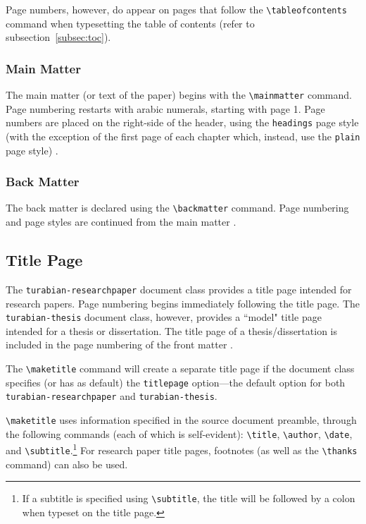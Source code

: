 \documentclass{article}
\newcommand{\textcmd}[1]{\texttt{\textbackslash #1}}
\begin{document}
Page numbers, however, do appear on pages that follow the \textcmd{tableofcontents} command when typesetting the table of contents (refer to subsection~\ref{subsec:toc}).

\subsubsection*{Main Matter}

The main matter (or text of the paper) begins with the \textcmd{mainmatter} command. Page numbering restarts with arabic numerals, starting with page 1. Page numbers are placed on the right-side of the header, using the \texttt{headings} page style (with the exception of the first page of each chapter which, instead, use the \texttt{plain} page style) \autocite[373--374]{turabian_manual_2013}.

\subsubsection*{Back Matter}

The back matter is declared using the \textcmd{backmatter} command. Page numbering and page styles are continued from the main matter \autocite[373--374]{turabian_manual_2013}.


\subsection{Title Page}
\label{subsec:titlepage}

The \texttt{turabian-researchpaper} document class provides a title page intended for research papers. Page numbering begins immediately following the title page. The \texttt{turabian-thesis} document class, however, provides a ``model" title page intended for a thesis or dissertation. The title page of a thesis/dissertation is included in the page numbering of the front matter \autocite[376, 378]{turabian_manual_2013}.

\clearpage
{}
The \textcmd{maketitle} command will create a separate title page if the document class specifies (or has as default) the \texttt{titlepage} option---the default option for both \texttt{turabian-researchpaper} and \texttt{turabian-thesis}.

\textcmd{maketitle} uses information specified in the source document preamble, through the following commands (each of which is self-evident): \textcmd{title}, \textcmd{author}, \textcmd{date}, and \textcmd{subtitle}.\footnote{%
	If a subtitle is specified using \textcmd{subtitle}, the title will be followed by a colon when typeset on the title page.}
For research paper title pages, footnotes (as well as the \textcmd{thanks} command) can also be used.
\end{document}
